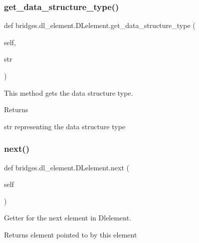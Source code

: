 \subsubsection{\texorpdfstring{get\+\_\+data\+\_\+structure\+\_\+type()}{get\_data\_structure\_type()}}
{\footnotesize\ttfamily def bridges.\+dl\+\_\+element.\+D\+Lelement.\+get\+\_\+data\+\_\+structure\+\_\+type (\begin{DoxyParamCaption}\item[{}]{self,  }\item[{}]{str }\end{DoxyParamCaption})}



This method gets the data structure type. 

\begin{DoxyReturn}{Returns}


str representing the data structure type 
\end{DoxyReturn}
\mbox{\label{classbridges_1_1dl__element_1_1_d_lelement_a43077e810ec453c9cd512ba75819e28a}} 
\subsubsection{\texorpdfstring{next()}{next()}\hspace{0.1cm}{\footnotesize\ttfamily [1/2]}}
{\footnotesize\ttfamily def bridges.\+dl\+\_\+element.\+D\+Lelement.\+next (\begin{DoxyParamCaption}\item[{}]{self }\end{DoxyParamCaption})}



Getter for the next element in Dlelement. 

\begin{DoxyReturn}{Returns}
element pointed to by this element 
\end{DoxyReturn}
\mbox{\label{classbridges_1_1dl__element_1_1_d_lelement_ae46f630cd7384689d4305770e6b2c7c1}} 
